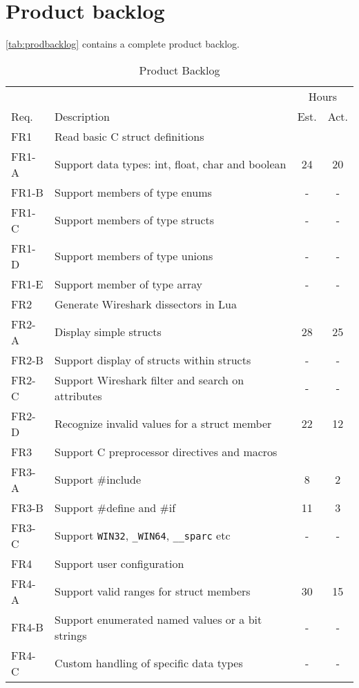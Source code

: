 \section{Product backlog}
\label{sec:prodbacklog}
\autoref{tab:prodbacklog} contains a complete product backlog.

\begin{table}[ht] \small \center
\caption{Product Backlog \label{tab:prodbacklog}}
\begin{tabularx}{\textwidth}{l X c c}
	\toprule
	& & \multicolumn{2}{c}{Hours} \\
	\cmidrule(r){3-4}
	Req. & Description & Est. & Act. \\
	\midrule
	FR1 & Read basic C struct definitions & & \\
	FR1-A & Support data types: int, float, char and boolean & 24 & 20 \\
	FR1-B & Support members of type enums & - & - \\
	FR1-C & Support members of type structs & - & - \\
	FR1-D & Support members of type unions & - & - \\
	FR1-E & Support member of type array & - & - \\
	\addlinespace
	FR2 & Generate Wireshark dissectors in Lua & & \\
	FR2-A & Display simple structs & 28 & 25 \\
	FR2-B & Support display of structs within structs & - & - \\
	FR2-C & Support Wireshark filter and search on attributes & - & - \\
	FR2-D & Recognize invalid values for a struct member & 22 & 12 \\
	\addlinespace
	FR3 & Support C preprocessor directives and macros & & \\
	FR3-A & Support \#include & 8 & 2 \\
	FR3-B & Support \#define and \#if & 11 & 3 \\
	FR3-C & Support \verb+WIN32+, \verb+_WIN64+, \verb+__sparc+ etc & - & - \\
	\addlinespace
	FR4 & Support user configuration & & \\
	FR4-A & Support valid ranges for struct members & 30 & 15 \\
	FR4-B & Support enumerated named values or a bit strings & - & - \\
	FR4-C & Custom handling of specific data types & - & - \\

\end{tabularx}
\end{table}
